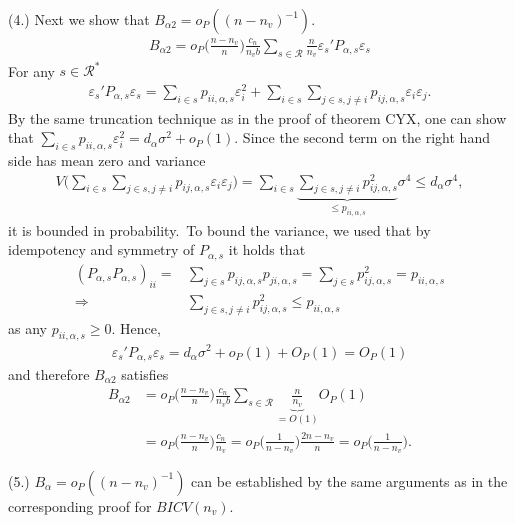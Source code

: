 \documentclass[Research_Module_ES.tex]{subfiles}
\begin{document}
(4.) Next we show that $B_{\alpha2} = o_P((n-n_v)^{-1})$.
\begin{align*}
B_{\alpha2} = o_P\biggl(\frac{n-n_v}{n}\biggr)\frac{c_n}{n_vb}\sum_{s\in\mathcal{R}}\frac{n}{n_v}\varepsilon_s'P_{\alpha,s}\varepsilon_s
\end{align*}
For any $s\in \mathcal{R}^\ast$
\begin{align*}
\varepsilon_s'P_{\alpha,s}\varepsilon_s = \sum_{i\in s} p_{ii,\alpha,s} \varepsilon_i^2 + \sum_{i \in s}\sum_{j\in s, j\neq i}  p_{ij,\alpha,s} \varepsilon_i\varepsilon_j.
\end{align*}
By the same truncation technique as in the proof of theorem CYX, one can show that $\sum_{i\in s} p_{ii,\alpha,s} \varepsilon_i^2 = d_\alpha\sigma^2 + o_P(1)$. Since the second term on the right hand side has mean zero and variance
\begin{align*}
V\biggl( \sum_{i \in s}\sum_{j\in s, j\neq i}  p_{ij,\alpha,s} \varepsilon_i\varepsilon_j\biggr) =  \sum_{i \in s}
\underbrace{\sum_{j\in s, j\neq i}  p_{ij,\alpha,s}^2}_{\le p_{ii,\alpha,s}} \sigma^4 \le d_\alpha \sigma^4,
\end{align*}
it is bounded in probability.\
To bound the variance, we used that by idempotency and symmetry of $P_{\alpha,s}$ it holds that
\begin{align*}
(P_{\alpha,s}P_{\alpha,s})_{ii} = &\sum_{j \in s} p_{ij,\alpha,s} p_{ji,\alpha,s} = \sum_{j \in s} p_{ij,\alpha,s}^2 = p_{ii,\alpha,s} \\
\Rightarrow &\sum_{j \in s, j\neq i}p_{ij,\alpha,s}^2 \le p_{ii,\alpha,s}
\end{align*}
as any $p_{ii,\alpha,s} \ge 0$. Hence, 
\begin{align*}
\varepsilon_s'P_{\alpha,s}\varepsilon_s = d_\alpha\sigma^2 + o_P(1) + O_P(1) = O_P(1)
\end{align*}
and therefore $B_{\alpha2}$ satisfies
\begin{align*}
B_{\alpha2} &= o_P\biggl(\frac{n-n_v}{n}\biggr)\frac{c_n}{n_vb}\sum_{s\in\mathcal{R}}\underbrace{\frac{n}{n_v}}_{=O(1)}O_P(1)\\
&= o_P\biggl(\frac{n-n_v}{n}\biggr)\frac{c_n}{n_v} = o_P\biggl(\frac{1}{n-n_v}\biggr)\frac{2n-n_v}{n} = o_P\biggl(\frac{1}{n-n_v}\biggr).
\end{align*}

(5.)
$B_{\alpha} = o_P((n-n_v)^{-1})$ can be established by the same arguments as in the corresponding proof for $BICV(n_v)$.
\end{document}
